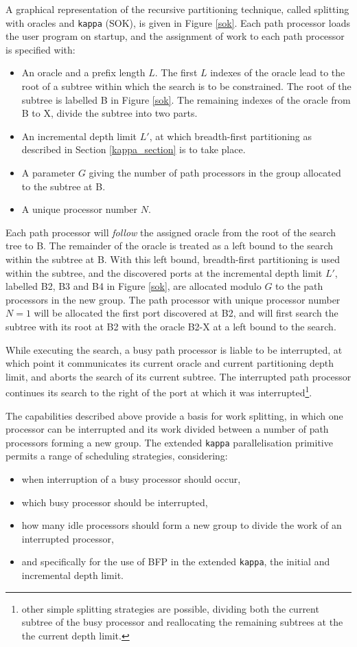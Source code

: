 \documentclass[a4paper,11pt,twoside]{article}
\begin{document}
A graphical representation of the recursive partitioning technique, called
splitting with oracles and \texttt{kappa} (SOK), is given in Figure \ref{sok}.
Each path processor loads the user program on startup, and the assignment of
work to each path processor is specified with:
\begin{itemize}
\item{An oracle and a prefix length $L$.
  The first $L$ indexes of the oracle lead to the root of a subtree within
  which the search is to be constrained.  The root of the subtree is labelled B
  in Figure \ref{sok}.
  The remaining indexes of the oracle from B to X, divide the subtree into
  two parts.}
\item{An incremental depth limit $L'$, at which breadth-first partitioning as described
  in Section \ref{kappa_section} is to take place.}
\item{A parameter $G$ giving the number of path processors in the group allocated to
  the subtree at B.}
\item{A unique processor number $N$.}
\end{itemize}

Each path processor will \textit{follow} the assigned oracle from the root of the
search tree to B.  The remainder of the oracle is treated as a left bound to the
search within the subtree at B. With this left bound,
breadth-first partitioning is used within the subtree, and the
discovered ports at the incremental depth limit $L'$, labelled B2, B3 and
B4 in Figure \ref{sok}, are allocated modulo $G$ to the path processors
in the new group.  The path processor with
unique processor number
$N=1$ will be allocated the first port discovered at B2, and will first search the
subtree with its root at B2 with the oracle B2-X at a left bound to the search.

While executing the search, a busy path processor is liable to be interrupted,
at which point it communicates its current oracle and current partitioning depth
limit, and aborts the search of its current subtree.  The interrupted path processor
continues its search to the right of the port at which it was interrupted\footnote{
other simple splitting strategies are possible, dividing both the current subtree of
the busy processor and reallocating the remaining subtrees at the the current depth
limit.}.

The capabilities described above provide a basis for work splitting, in which one
processor can be interrupted and its work divided between a
number of path processors forming a new group.  The
extended \texttt{kappa} parallelisation primitive permits a range of scheduling strategies, 
considering:
\begin{itemize}
\item{when interruption of a busy processor should occur,}
\item{which busy processor should be interrupted,}
\item{how many idle processors should form a new group to divide the work of an
  interrupted processor,}
\item{and specifically for the use of BFP in the extended \texttt{kappa}, the initial
  and incremental depth limit.}
\end{itemize}
\end{document}
